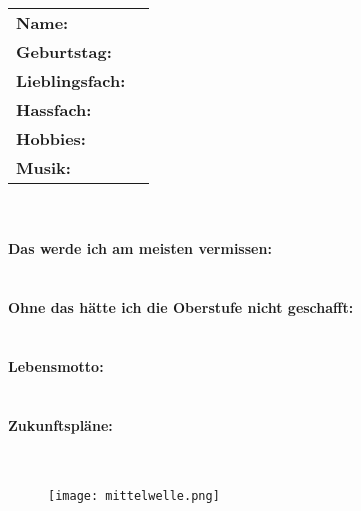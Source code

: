 \hspace*{\tablex}\large\begin{minipage}{\tablewidth}
	\begin{tabular}{@{}ll@{}}
		\textbf{Name:}          & \stdname                                                  \\
		\textbf{Geburtstag:}    & \multicolumn{1}{p{\tablewidth}}{\RaggedRight\stdbirthday} \\
		\textbf{Lieblingsfach:} & \multicolumn{1}{p{\tablewidth}}{\RaggedRight\stdfavsub}   \\
		\textbf{Hassfach:}      & \multicolumn{1}{p{\tablewidth}}{\RaggedRight\stdhatesub}  \\
		\textbf{Hobbies:}       & \multicolumn{1}{p{\tablewidth}}{\RaggedRight\stdhobbies}  \\
		\textbf{Musik:}         & \multicolumn{1}{p{\tablewidth}}{\RaggedRight\stdmusic}    \\
	\end{tabular}\\~\\
	\textbf{Das werde ich am meisten vermissen:}\\\stdmissing\\~\\
	\textbf{Ohne das hätte ich die Oberstufe nicht geschafft:}\\\stdmotivation\\~\\
	\textbf{Lebensmotto:}\\\stdquote\\~\\
	\textbf{Zukunftspläne:}\\\stdfuture\\~\\
\end{minipage}

\begin{figure}[H]
	\hspace*{-2.5cm}\texttt{[image: mittelwelle.png]}
\end{figure}

\def\commentswidth{0.7\linewidth}
\ifoddpage
	\def\commentsx{-1cm}
\else
	\def\commentsx{\framewidth}
\fi
